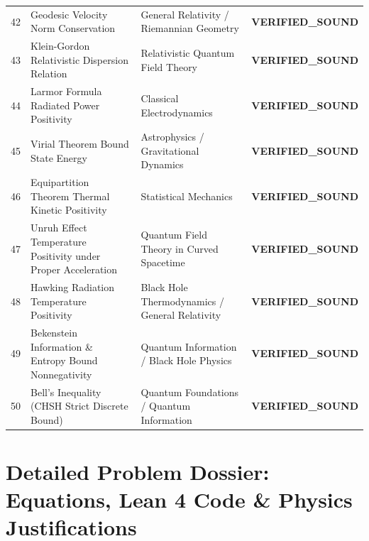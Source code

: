 \documentclass[10pt,a4paper]{article}
\begin{document}
\begin{longtable}{p{0.6cm} p{6.8cm} p{4.0cm} p{3.2cm}}
42 & Geodesic Velocity Norm Conservation & General Relativity / Riemannian Geometry & \textcolor{green!70!black}{\textbf{VERIFIED\_SOUND}} \\
43 & Klein-Gordon Relativistic Dispersion Relation & Relativistic Quantum Field Theory & \textcolor{green!70!black}{\textbf{VERIFIED\_SOUND}} \\
44 & Larmor Formula Radiated Power Positivity & Classical Electrodynamics & \textcolor{green!70!black}{\textbf{VERIFIED\_SOUND}} \\
45 & Virial Theorem Bound State Energy & Astrophysics / Gravitational Dynamics & \textcolor{green!70!black}{\textbf{VERIFIED\_SOUND}} \\
46 & Equipartition Theorem Thermal Kinetic Positivity & Statistical Mechanics & \textcolor{green!70!black}{\textbf{VERIFIED\_SOUND}} \\
47 & Unruh Effect Temperature Positivity under Proper Acceleration & Quantum Field Theory in Curved Spacetime & \textcolor{green!70!black}{\textbf{VERIFIED\_SOUND}} \\
48 & Hawking Radiation Temperature Positivity & Black Hole Thermodynamics / General Relativity & \textcolor{green!70!black}{\textbf{VERIFIED\_SOUND}} \\
49 & Bekenstein Information \& Entropy Bound Nonnegativity & Quantum Information / Black Hole Physics & \textcolor{green!70!black}{\textbf{VERIFIED\_SOUND}} \\
50 & Bell's Inequality (CHSH Strict Discrete Bound) & Quantum Foundations / Quantum Information & \textcolor{green!70!black}{\textbf{VERIFIED\_SOUND}} \\
\end{longtable}
\newpage
\section{Detailed Problem Dossier: Equations, Lean 4 Code \& Physics Justifications}
\end{document}
